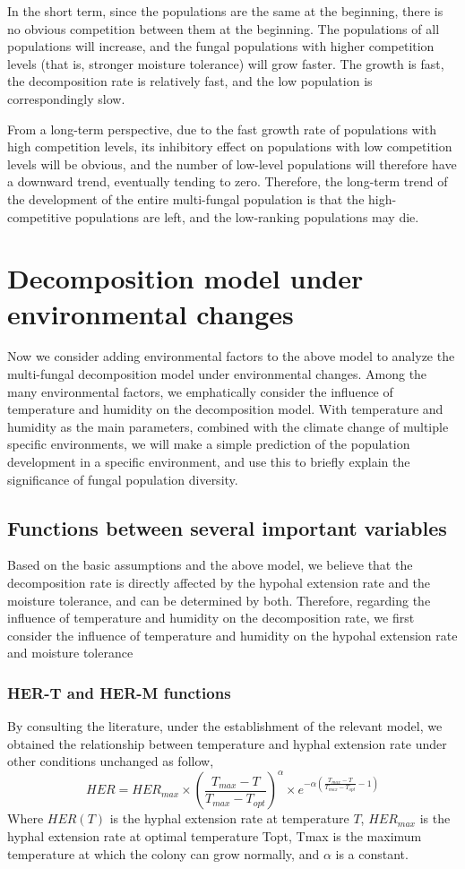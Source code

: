 \documentclass{mcmthesis}
\begin{document}
In the short term, since the populations are the same at the beginning, there is no obvious competition between them at the beginning. The populations of all populations will increase, and the fungal populations with higher competition levels (that is, stronger moisture tolerance) will grow faster. The growth is fast, the decomposition rate is relatively fast, and the low population is correspondingly slow. 

From a long-term perspective, due to the fast growth rate of populations with high competition levels, its inhibitory effect on populations with low competition levels will be obvious, and the number of low-level populations will therefore have a downward trend, eventually tending to zero. Therefore, the long-term trend of the development of the entire multi-fungal population is that the high-competitive populations are left, and the low-ranking populations may die.


\section{Decomposition model under environmental changes}
Now we consider adding environmental factors to the above model to analyze the multi-fungal decomposition model under environmental changes. Among the many environmental factors, we emphatically consider the influence of temperature and humidity on the decomposition model. With temperature and humidity as the main parameters, combined with the climate change of multiple specific environments, we will make a simple prediction of the population development in a specific environment, and use this to briefly explain the significance of fungal population diversity.
\subsection{Functions between several important variables}
Based on the basic assumptions and the above model, we believe that the decomposition rate is directly affected by the hypohal extension rate and the moisture tolerance, and can be determined by both. Therefore, regarding the influence of temperature and humidity on the decomposition rate, we first consider the influence of temperature and humidity on the hypohal extension rate and moisture tolerance
\subsubsection{HER-T and HER-M functions}
By consulting the literature, under the establishment of the relevant model, we obtained the relationship between temperature and hyphal extension rate under other conditions unchanged as follow,
\begin{equation}
	HER=HER_{max}{\times}(\frac{T_{max}-T}{T_{max}-T_{opt}})^{\alpha}{\times}e^{-{\alpha}(\frac{T_{max}-T}{T_{max}-T_{opt}}-1)}
\end{equation} 
Where $HER(T)$ is the hyphal extension rate at temperature $T$, $HER_{max}$ is the hyphal extension rate at optimal temperature Topt, Tmax is the maximum temperature at which the colony can grow normally, and $\alpha$ is a constant. 
\end{document}
